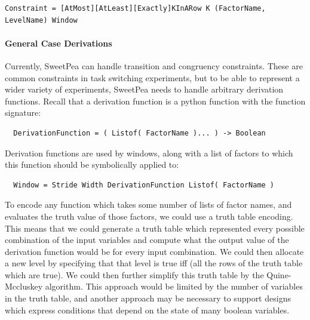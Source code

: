 \begin{verbatim}
Constraint = [AtMost][AtLeast][Exactly]KInARow K (FactorName, LevelName) Window
\end{verbatim}

\paragraph*{General Case Derivations}

Currently, SweetPea can handle transition and congruency constraints. These are common constraints in task switching experiments, but to be able to represent a wider variety of experiments, SweetPea needs to handle arbitrary derivation functions. Recall that a derivation function is a python function with the function signature:

\begin{verbatim}
  DerivationFunction = ( Listof( FactorName )... ) -> Boolean
\end{verbatim}

Derivation functions are used by windows, along with a list of factors to which this function should be symbolically applied to:

\begin{verbatim}
  Window = Stride Width DerivationFunction Listof( FactorName )
\end{verbatim}

To encode any function which takes some number of lists of factor names, and evaluates the truth value of those factors, we could use a truth table encoding. This means that we could generate a truth table which represented every possible combination of the input variables and compute what the output value of the derivation function would be for every input combination. We could then allocate a new level by specifying that that level is true iff (all the rows of the truth table which are true). We could then further simplify this truth table by the Quine-Mccluskey algorithm. This approach would be limited by the number of variables in the truth table, and another approach may be necessary to support designs which express conditions that depend on the state of many boolean variables.

%
%
%

